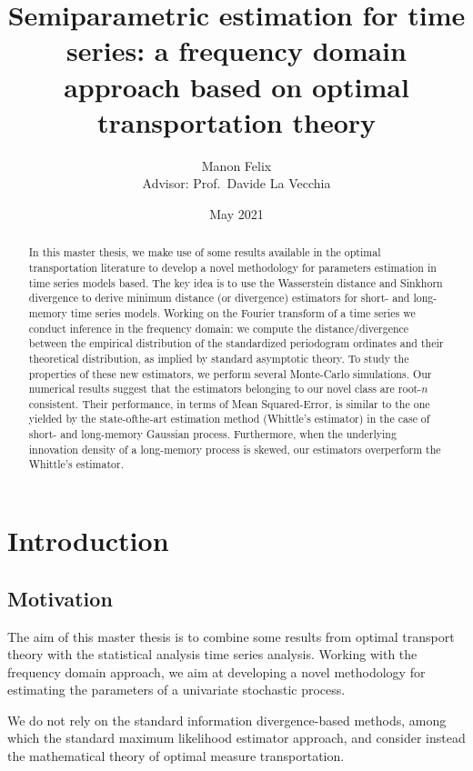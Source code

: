 \documentclass[
  11pt,
]{article}
\title{Semiparametric estimation for time series: a frequency domain
approach based on optimal transportation theory}
\author{Manon Felix\\
Advisor: Prof.~Davide La Vecchia}
\date{May 2021}
\begin{document}
\maketitle
\begin{abstract}
In this master thesis, we make use of some results available in the
optimal transportation literature to develop a novel methodology for
parameters estimation in time series models based. The key idea is to
use the Wasserstein distance and Sinkhorn divergence to derive minimum
distance (or divergence) estimators for short- and long-memory time
series models. Working on the Fourier transform of a time series we
conduct inference in the frequency domain: we compute the
distance/divergence between the empirical distribution of the
standardized periodogram ordinates and their theoretical distribution,
as implied by standard asymptotic theory. To study the properties of
these new estimators, we perform several Monte-Carlo simulations. Our
numerical results suggest that the estimators belonging to our novel
class are root-\(n\) consistent. Their performance, in terms of Mean
Squared-Error, is similar to the one yielded by the state-ofthe-art
estimation method (Whittle's estimator) in the case of short- and
long-memory Gaussian process. Furthermore, when the underlying
innovation density of a long-memory process is skewed, our estimators
overperform the Whittle's estimator.
\end{abstract}

\newpage

\tableofcontents

\newpage

\hypertarget{introduction}{%
\section{Introduction}\label{introduction}}

\hypertarget{motivation}{%
\subsection{Motivation}\label{motivation}}

The aim of this master thesis is to combine some results from optimal
transport theory with the statistical analysis time series analysis.
Working with the frequency domain approach, we aim at developing a novel
methodology for estimating the parameters of a univariate stochastic
process.

We do not rely on the standard information divergence-based methods,
among which the standard maximum likelihood estimator approach, and
consider instead the mathematical theory of optimal measure
transportation.
\end{document}
